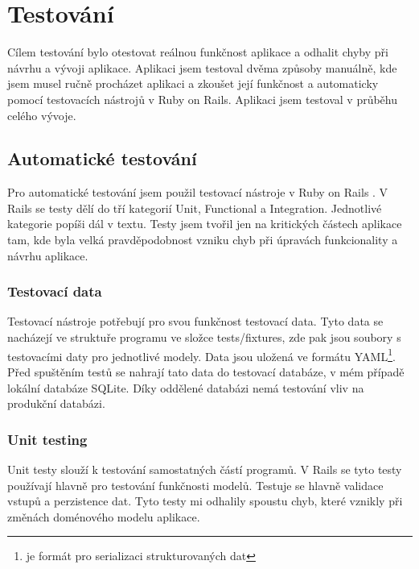 \chapter{Testování}

Cílem testování bylo otestovat reálnou funkčnost aplikace a odhalit chyby při návrhu a vývoji aplikace. Aplikaci jsem testoval dvěma způsoby manuálně, kde jsem musel ručně procházet aplikaci a zkoušet její funkčnost a automaticky pomocí testovacích nástrojů v Ruby on Rails. Aplikaci jsem testoval v průběhu celého vývoje. 

\section{Automatické testování}
Pro automatické testování jsem použil testovací nástroje v Ruby on Rails \cite{RoR_testing}. V Rails se testy dělí do tří kategorií Unit, Functional a Integration. Jednotlivé kategorie popíši dál v textu. Testy jsem tvořil jen na kritických částech aplikace tam,  kde byla velká pravděpodobnost vzniku chyb při úpravách funkcionality a návrhu aplikace.


\subsection{Testovací data}
Testovací nástroje potřebují pro svou funkčnost testovací data. Tyto data se nacházejí ve struktuře programu ve složce tests/fixtures, zde  pak jsou soubory s testovacími daty pro jednotlivé modely. Data jsou uložená ve formátu YAML\footnote{je formát pro serializaci strukturovaných dat}. Před spuštěním testů se nahrají tato data do testovací databáze, v mém případě lokální databáze SQLite. Díky oddělené databázi nemá testování vliv na produkční databázi.

\subsection{Unit testing}
Unit testy slouží k testování samostatných částí programů. V Rails se tyto testy používají hlavně pro testování funkčnosti modelů. Testuje se hlavně validace vstupů a perzistence dat. Tyto testy mi odhalily spoustu chyb, které vznikly při změnách doménového modelu aplikace.

